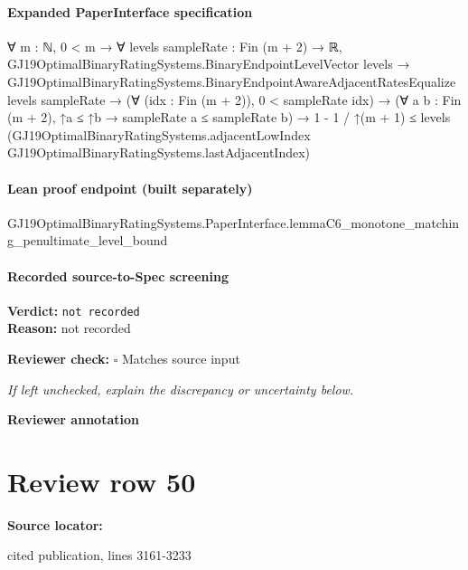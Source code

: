 \documentclass[10pt]{article}
\newcommand{\reviewerbox}{%
  \par\noindent\fbox{\parbox{0.96\linewidth}{\rule{0pt}{0.38in}}}\par
}
\newcommand{\reviewmatch}[1]{%
  \par\noindent\textbf{Reviewer check:} $\square$\; #1\par
  \noindent\emph{If left unchecked, explain the discrepancy or uncertainty below.}\par
}
\begin{document}
\paragraph{Expanded PaperInterface specification}
\begin{ReviewVerbatim}
∀ {m : ℕ},
  0 < m →
    ∀ {levels sampleRate : Fin (m + 2) → ℝ},
      GJ19OptimalBinaryRatingSystems.BinaryEndpointLevelVector levels →
        GJ19OptimalBinaryRatingSystems.BinaryEndpointAwareAdjacentRatesEqualize levels sampleRate →
          (∀ (idx : Fin (m + 2)), 0 < sampleRate idx) →
            (∀ {a b : Fin (m + 2)}, ↑a ≤ ↑b → sampleRate a ≤ sampleRate b) →
              1 - 1 / ↑(m + 1) ≤
                levels
                  (GJ19OptimalBinaryRatingSystems.adjacentLowIndex GJ19OptimalBinaryRatingSystems.lastAdjacentIndex)
\end{ReviewVerbatim}

\paragraph{Lean proof endpoint (built separately)}\begin{ReviewVerbatim}
GJ19OptimalBinaryRatingSystems.PaperInterface.lemmaC6_monotone_matching_penultimate_level_bound
\end{ReviewVerbatim}

\paragraph{Recorded source-to-Spec screening}
\textbf{Verdict:} \texttt{not recorded}
\\
\textbf{Reason:} not recorded
\reviewmatch{Matches source input}
\noindent\textbf{Reviewer annotation}\par
\reviewerbox
\clearpage
\hypertarget{source-claim-2d8e50cd70ac2429}{}
\section*{Review row 50}
\textbf{Source locator:} {\footnotesize\raggedright cited publication, lines 3161-\allowbreak{}3233\par}
\end{document}

